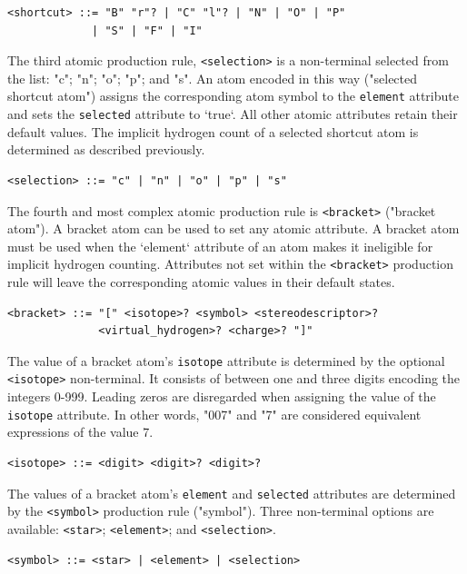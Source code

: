 \documentclass{article}
\def\ttt{\texttt}
\begin{document}
\begin{lstlisting}
<shortcut> ::= "B" "r"? | "C" "l"? | "N" | "O" | "P"
             | "S" | "F" | "I"
\end{lstlisting}

The third atomic production rule, \ttt{<selection>} is a non-terminal selected from the list: "c"; "n"; "o"; "p"; and "s". An atom encoded in this way ("selected shortcut atom") assigns the corresponding atom symbol to the \ttt{element} attribute and sets the \ttt{selected} attribute to `true`. All other atomic attributes retain their default values. The implicit hydrogen count of a selected shortcut atom is determined as described previously.

\begin{lstlisting}
<selection> ::= "c" | "n" | "o" | "p" | "s"
\end{lstlisting}

The fourth and most complex atomic production rule is \ttt{<bracket>} ("bracket atom"). A bracket atom can be used to set any atomic attribute. A bracket atom must be used when the `element` attribute of an atom makes it ineligible for implicit hydrogen counting. Attributes not set within the \ttt{<bracket>} production rule will leave the corresponding atomic values in their default states.

\begin{lstlisting}
<bracket> ::= "[" <isotope>? <symbol> <stereodescriptor>?
              <virtual_hydrogen>? <charge>? "]"
\end{lstlisting}

The value of a bracket atom's \ttt{isotope} attribute is determined by the optional \ttt{<isotope>} non-terminal. It consists of between one and three digits encoding the integers 0-999. Leading zeros are disregarded when assigning the value of the \ttt{isotope} attribute. In other words, "007" and "7" are considered equivalent expressions of the value 7.

\begin{lstlisting}
<isotope> ::= <digit> <digit>? <digit>?
\end{lstlisting}

The values of a bracket atom's \ttt{element} and \ttt{selected} attributes are determined by the \ttt{<symbol>} production rule ("symbol"). Three non-terminal options are available: \ttt{<star>}; \ttt{<element>}; and \ttt{<selection>}.

\begin{lstlisting}
<symbol> ::= <star> | <element> | <selection>
\end{lstlisting}
\end{document}
